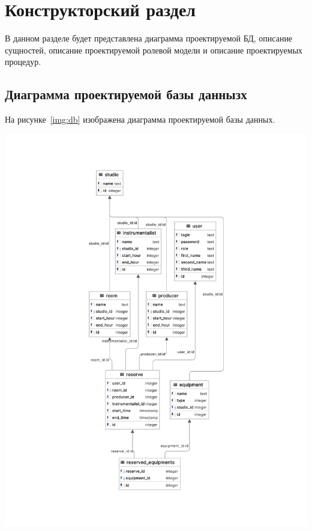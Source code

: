\chapter{Конструкторский раздел}

В данном разделе будет представлена диаграмма проектируемой БД, описание сущностей, описание проектируемой ролевой модели и описание проектируемых процедур.

\section{Диаграмма проектируемой базы даннызх}
На рисунке~\ref{img:db} изображена диаграмма проектируемой базы данных.

\begin{center}
	\centering
	\includegraphics[height=0.83\textheight]{inc/img/public}
	\label{img:db}
\end{center}
